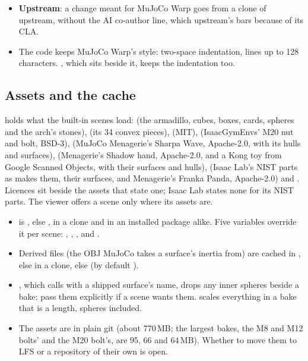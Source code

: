 \begin{itemize}
\item \textbf{Upstream}: a change meant for MuJoCo Warp goes from a clone of upstream, without the AI co-author line, which upstream's  bars because of its CLA.
\item The code keeps MuJoCo Warp's style: two-space indentation, lines up to 128 characters. , which sits beside it, keeps the indentation too.
\end{itemize}

\subsection{Assets and the cache}\label{sec:assets}

 holds what the built-in scenes load:  (the armadillo, cubes, boxes, cards, spheres and the arch's stones),  (its 34 convex pieces),  (MIT),  (IsaacGymEnvs' M20 nut and bolt, BSD-3),  (MuJoCo Menagerie's Sharpa Wave, Apache-2.0, with its hulls and surfaces),  (Menagerie's Shadow hand, Apache-2.0, and a Kong toy from Google Scanned Objects, with their surfaces and hulls),  (Isaac Lab's NIST parts as  makes them, their surfaces, and Menagerie's Franka Panda, Apache-2.0) and . Licences sit beside the assets that state one; Isaac Lab states none for its NIST parts. The viewer offers a scene only where its assets are.

\begin{itemize}
\item {} is , else , in a clone and in an installed package alike. Five variables override it per scene: , , ,  and .
\item Derived files (the OBJ MuJoCo takes a surface's inertia from) are cached in , else  in a clone, else  (by default ).
\item {}, which  calls with a shipped surface's name, drops any inner spheres beside a bake; pass them explicitly if a scene wants them.  scales everything in a bake that is a length, spheres included.
\item The assets are in plain git (about 770\,MB; the largest bakes, the M8 and M12 bolts' and the M20 bolt's, are 95, 66 and 64\,MB). Whether to move them to LFS or a repository of their own is open.
\end{itemize}

